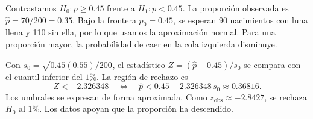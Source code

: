 Contrastamos $H_0:p\ge0.45$ frente a $H_1:p<0.45$.
La proporción observada es $\hat p=70/200=0.35$.
Bajo la frontera $p_0=0.45$, se esperan 90 nacimientos con
luna llena y 110 sin ella, por lo que usamos la aproximación normal.
Para una proporción mayor, la probabilidad de caer en la cola
izquierda disminuye.

Con $s_0=\sqrt{0.45(0.55)/200}$, el estadístico
$Z=(\hat p-0.45)/s_0$ se compara con el cuantil inferior del $1\%$.
La región de rechazo es
\[
Z<-2.326348
\quad\Longleftrightarrow\quad
\hat p<0.45-2.326348\,s_0\approx\boxed{0.36816}.
\]
Los umbrales se expresan de forma aproximada. Como
$z_{\mathrm{obs}}\approx-2.8427$, se rechaza $H_0$ al $1\%$.
Los datos apoyan que la proporción ha descendido.

